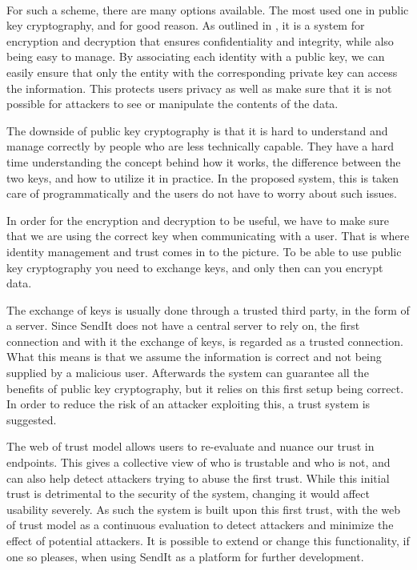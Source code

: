\paragraph{}
%
For such a scheme, there are many options available. The most used one in public key cryptography, and for good reason. As outlined in , it is a system for encryption and decryption that ensures confidentiality and integrity, while also being easy to manage. By associating each identity with a public key, we can easily ensure that only the entity with the corresponding private key can access the information. This protects users privacy as well as make sure that it is not possible for attackers to see or manipulate the contents of the data.

The downside of public key cryptography is that it is hard to understand and manage correctly by people who are less technically capable. They have a hard time understanding the concept behind how it works, the difference between the two keys, and how to utilize it in practice. In the proposed system, this is taken care of programmatically and the users do not have to worry about such issues.

In order for the encryption and decryption to be useful, we have to make sure that we are using the correct key when communicating with a user. That is where identity management and trust comes in to the picture. To be able to use public key cryptography you need to exchange keys, and only then can you encrypt data.

The exchange of keys is usually done through a trusted third party, in the form of a server. Since SendIt does not have a central server to rely on, the first connection and with it the exchange of keys, is regarded as a trusted connection. What this means is that we assume the information is correct and not being supplied by a malicious user. Afterwards the system can guarantee all the benefits of public key cryptography, but it relies on this first setup being correct. In order to reduce the risk of an attacker exploiting this, a trust system is suggested.

The web of trust model allows users to re-evaluate and nuance our trust in endpoints. This gives a collective view of who is trustable and who is not, and can also help detect attackers trying to abuse the first trust. While this initial trust is detrimental to the security of the system, changing it would affect usability severely. As such the system is built upon this first trust, with the web of trust model as a continuous evaluation to detect attackers and minimize the effect of potential attackers. It is possible to extend or change this functionality, if one so pleases, when using SendIt as a platform for further development.
%
